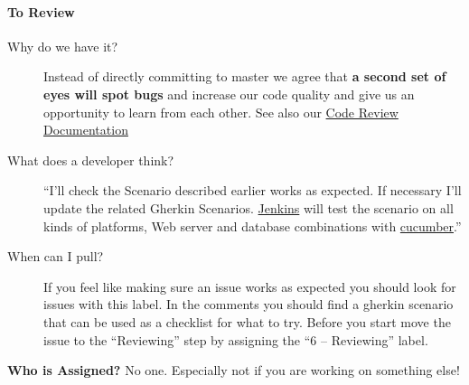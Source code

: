 \documentclass[letterpaper,10pt,english]{sphinxmanual}
\begin{document}
\paragraph{To Review}
\label{bugtracker/kanban:to-review}\begin{description}
\item[{Why do we have it?}] \leavevmode
Instead of directly committing to master we agree that \textbf{a second set of eyes
will spot bugs} and increase our code quality and give us an opportunity to
learn from each other. See also our \href{https://owncloud.org/dev/code-reviews-on-github/}{Code Review Documentation}

\item[{What does a developer think?}] \leavevmode
``I’ll check the Scenario described earlier works as expected. If necessary
I’ll update the related Gherkin Scenarios. \href{https://ci.tmit.eu/}{Jenkins} will test the scenario
on all kinds of platforms, Web server and database combinations with
\href{http://cukes.info/}{cucumber}.''

\item[{When can I pull?}] \leavevmode
If you feel like making sure an issue works as expected you should look for
issues with this label. In the comments you should find a gherkin scenario that
can be used as a checklist for what to try. Before you start move the issue to
the “Reviewing” step by assigning the “6 – Reviewing” label.

\end{description}

\textbf{Who is Assigned?} No one. Especially not if you are working on something else!
\end{document}
